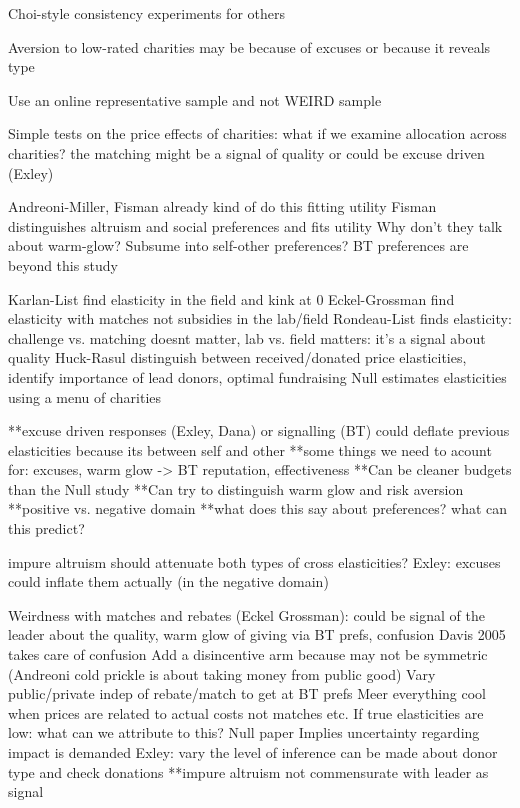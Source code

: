 \documentclass[aspectratio=169]{beamer}
\begin{document}
\begin{frame}[fragile]
    Choi-style consistency experiments for others

    Aversion to low-rated charities may be because of excuses or because it reveals type

    Use an online representative sample and not WEIRD sample

    Simple tests on the price effects of charities: what if we examine allocation across charities? the matching might be a signal of quality or could be excuse driven (Exley)

        Andreoni-Miller, Fisman already kind of do this fitting utility
        Fisman distinguishes altruism and social preferences and fits utility
            Why don't they talk about warm-glow? Subsume into self-other preferences? BT preferences are beyond this study

        Karlan-List find elasticity in the field and kink at 0
        Eckel-Grossman find elasticity with matches not subsidies in the lab/field
        Rondeau-List finds elasticity: challenge vs. matching doesnt matter, lab vs. field matters: it's a signal about quality
        Huck-Rasul distinguish between received/donated price elasticities, identify importance of lead donors, optimal fundraising
        Null estimates elasticities using a menu of charities

        **excuse driven responses (Exley, Dana) or signalling (BT) could deflate previous elasticities because its between self and other
        **some things we need to acount for: excuses, warm glow -> BT reputation, effectiveness
        **Can be cleaner budgets than the Null study
        **Can try to distinguish warm glow and risk aversion
        **positive vs. negative domain
        **what does this say about preferences? what can this predict?

        impure altruism should attenuate both types of cross elasticities? Exley: excuses could inflate them actually (in the negative domain)

        Weirdness with matches and rebates (Eckel Grossman): could be signal of the leader about the quality, warm glow of giving via BT prefs, confusion
            Davis 2005 takes care of confusion
            Add a disincentive arm because may not be symmetric (Andreoni cold prickle is about taking money from public good)
            Vary public/private indep of rebate/match to get at BT prefs
        Meer everything cool when prices are related to actual costs not matches etc.
        If true elasticities are low: what can we attribute to this? Null paper
        Implies uncertainty regarding impact is demanded
        Exley: vary the level of inference can be made about donor type and check donations
        **impure altruism not commensurate with leader as signal

\end{frame}
\end{document}
